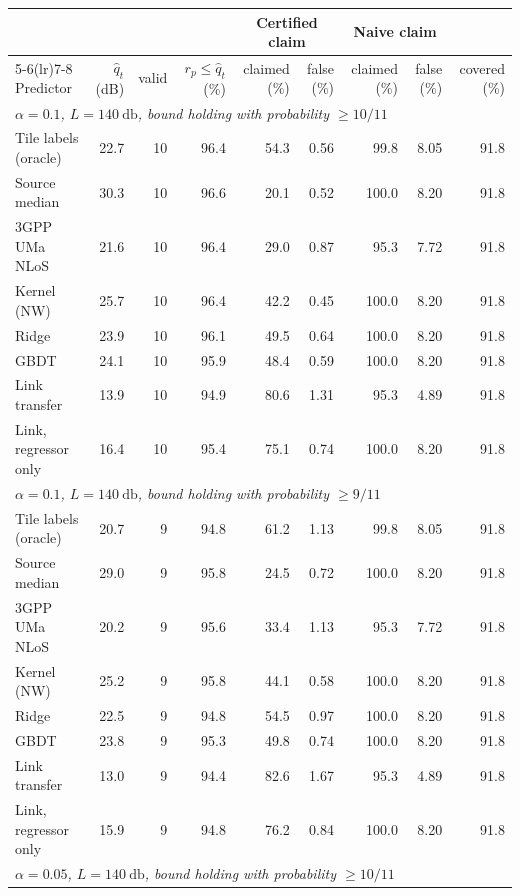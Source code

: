 \begin{tabular}{lrrrrrrrr}
\toprule
& & & & \multicolumn{2}{c}{Certified claim} & \multicolumn{2}{c}{Naive claim} & \\
\cmidrule(lr){5-6}\cmidrule(lr){7-8}
Predictor & $\hat q_t$ (dB) & valid & $r_p\le\hat q_t$ (\%) & claimed (\%) & false (\%) & claimed (\%) & false (\%) & covered (\%) \\
\midrule
\multicolumn{9}{l}{\emph{$\alpha=0.1$, $L=\SI{140}{\decibel}$, bound holding with probability $\ge 10/11$}} \\
Tile labels (oracle) & 22.7 & 10 & 96.4 & 54.3 & 0.56 & 99.8 & 8.05 & 91.8 \\
Source median & 30.3 & 10 & 96.6 & 20.1 & 0.52 & 100.0 & 8.20 & 91.8 \\
3GPP UMa NLoS & 21.6 & 10 & 96.4 & 29.0 & 0.87 & 95.3 & 7.72 & 91.8 \\
Kernel (NW) & 25.7 & 10 & 96.4 & 42.2 & 0.45 & 100.0 & 8.20 & 91.8 \\
Ridge & 23.9 & 10 & 96.1 & 49.5 & 0.64 & 100.0 & 8.20 & 91.8 \\
GBDT & 24.1 & 10 & 95.9 & 48.4 & 0.59 & 100.0 & 8.20 & 91.8 \\
Link transfer & 13.9 & 10 & 94.9 & 80.6 & 1.31 & 95.3 & 4.89 & 91.8 \\
Link, regressor only & 16.4 & 10 & 95.4 & 75.1 & 0.74 & 100.0 & 8.20 & 91.8 \\
\multicolumn{9}{l}{\emph{$\alpha=0.1$, $L=\SI{140}{\decibel}$, bound holding with probability $\ge 9/11$}} \\
Tile labels (oracle) & 20.7 & 9 & 94.8 & 61.2 & 1.13 & 99.8 & 8.05 & 91.8 \\
Source median & 29.0 & 9 & 95.8 & 24.5 & 0.72 & 100.0 & 8.20 & 91.8 \\
3GPP UMa NLoS & 20.2 & 9 & 95.6 & 33.4 & 1.13 & 95.3 & 7.72 & 91.8 \\
Kernel (NW) & 25.2 & 9 & 95.8 & 44.1 & 0.58 & 100.0 & 8.20 & 91.8 \\
Ridge & 22.5 & 9 & 94.8 & 54.5 & 0.97 & 100.0 & 8.20 & 91.8 \\
GBDT & 23.8 & 9 & 95.3 & 49.8 & 0.74 & 100.0 & 8.20 & 91.8 \\
Link transfer & 13.0 & 9 & 94.4 & 82.6 & 1.67 & 95.3 & 4.89 & 91.8 \\
Link, regressor only & 15.9 & 9 & 94.8 & 76.2 & 0.84 & 100.0 & 8.20 & 91.8 \\
\multicolumn{9}{l}{\emph{$\alpha=0.05$, $L=\SI{140}{\decibel}$, bound holding with probability $\ge 10/11$}} \\

\end{tabular}
